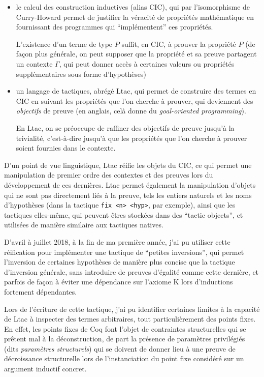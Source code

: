 \documentclass[]{article}
\begin{document}
\begin{itemize}
\item
  le calcul des construction inductives (alias CIC), qui par
  l'isomorphisme de Curry-Howard permet de justifier la véracité de
  propriétés mathématique en fournissant des programmes qui
  ``implémentent'' ces propriétés.

  L'existence d'un terme de type \(P\) suffit, en CIC, à prouver la
  propriété \(P\) (de façon plus générale, on peut supposer que la
  propriété et sa preuve partagent un contexte \(\Gamma\), qui peut
  donner accès à certaines valeurs ou propriétés supplémentaires sous
  forme d'hypothèses)
\item
  un langage de tactiques, abrégé Ltac, qui permet de construire des
  termes en CIC en suivant les propriétés que l'on cherche à prouver,
  qui deviennent des \emph{objectifs} de preuve (en anglais, celà donne
  du \emph{goal-oriented programming}).

  En Ltac, on se préoccupe de raffiner des objectifs de preuve jusqu'à
  la trivialité, c'est-à-dire jusqu'à que les propriétés que l'on
  cherche à prouver soient fournies dans le contexte.
\end{itemize}

D'un point de vue linguistique, Ltac réifie les objets du CIC, ce qui
permet une manipulation de premier ordre des contextes et des preuves
lors du développement de ces dernières. Ltac permet également la
manipulation d'objets qui ne sont pas directement liés à la preuve, tels
les entiers naturels et les noms d'hypothèses (dans la tactique
\texttt{fix\ \textless{}n\textgreater{}\ \textless{}hyp\textgreater{}},
par exemple), ainsi que les tactiques elles-même, qui peuvent êtres
stockées dans des ``tactic objects'', et utilisées de manière similaire
aux tactiques natives.

D'avril à juillet 2018, à la fin de ma première année, j'ai pu utiliser
cette réification pour implémenter une tactique de ``petites
inversions'', qui permet l'inversion de certaines hypothèses de manière
plus concise que la tactique d'inversion générale, sans introduire de
preuves d'égalité comme cette dernière, et parfois de façon à éviter une
dépendance sur l'axiome K lors d'inductions fortement dépendantes.

Lors de l'écriture de cette tactique, j'ai pu identifier certaines
limites à la capacité de Ltac à inspecter des termes arbitraires, tout
particulièrement des points fixes. En effet, les points fixes de Coq
font l'objet de contraintes structurelles qui se prêtent mal à la
déconstruction, de part la présence de paramètres privilégiés (dits
\emph{paramètres structurels}) qui se doivent de donner lieu à une
preuve de décroissance structurelle lors de l'instanciation du point
fixe considéré sur un argument inductif concret.
\end{document}
